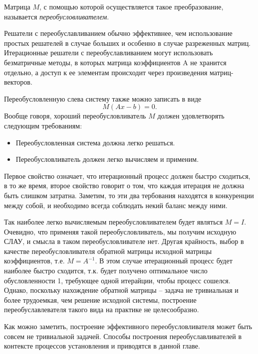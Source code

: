 \documentclass[a4paper,14pt]{extreport}
\begin{document}
	Матрица $M$, с помощью которой осуществляется такое преобразование, называется \textit{переобусловливателем}. 
  
  Решатели с переобуславливанием обычно эффективнее, чем использование простых решателей в случае больших и особенно в случае разреженных матриц. Итерационные решатели с переобуславливанием могут использовать безматричные методы, в которых матрица коэффициентов A не хранится отдельно, а доступ к ее элементам происходит через произведения матриц-векторов\cite{wiki-precond}.
  
  Переобусловленную слева систему также можно записать в виде 
  \begin{equation}
	\label{precondslau2}
	M(Ax-b)=0.
	\end{equation}
 Вообще говоря, хороший переобусловливатель $M$ должен удовлетворять следующим требованиям:	
 \begin{itemize}
 \item Переобусловленная система должна легко решаться.
 \item Переобусловливатель должен легко вычисляем и применим\cite{benzi}.
 \end{itemize}
 Первое свойство означает, что итерационный процесс должен быстро сходиться, в то же время, второе свойство говорит о том, что каждая итерация не должна быть слишком затратна. Заметим, то эти два тербования находятся в конкуренции между собой, и необходимо всегда соблюдать некий баланс между ними.
 
 Так наиболее легко вычисляемым переобусловливателем будет являться $M = I$. Очевидно, что применяя такой переобусловливатель, мы получим исходную СЛАУ, и смысла в таком переобусловливателе нет. Другая крайность, выбор в качестве переобусловливателя обратной матрицы исходной матрицы коэффициентов, т.е. $M = A^{-1}$. В этом случае итерационный процесс будет наиболее быстро сходится, т.к. будет получено оптимальное число обусловленности 1, требующее одной итерайции, чтобы процесс сошелся. Однако, поскольку нахождение обратной матрицы -- задача не тривиальная и более трудоемкая, чем решение исходной системы, построение переобуславлевателя такого вида на практике не целесообразно.  
	
	Как можно заметить, построение эффективного переобусловливателя может быть совсем не тривиальной задачей. Способы построения переобуславливателей в контексте процессов установления и приводятся в данной главе.
    
\end{document}
